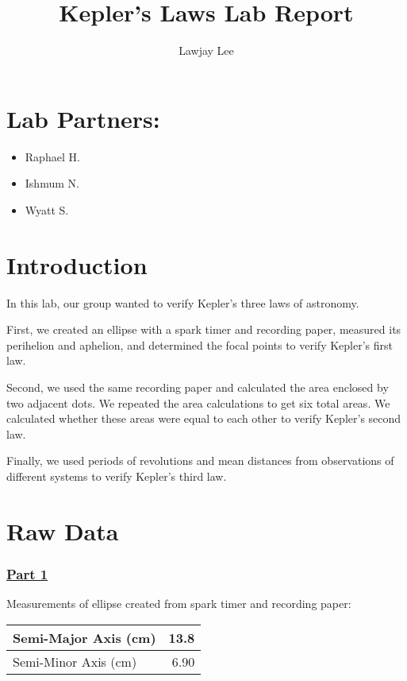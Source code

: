 \documentclass[fleqn]{article}
\title{Kepler's Laws Lab Report}
\author{Lawjay Lee}
\date{}
\begin{document}
\maketitle

\section*{Lab Partners:}
\begin{itemize}
	\item Raphael H.
	\item Ishmum N.
	\item Wyatt S.
\end{itemize}

\section*{Introduction}
In this lab, our group wanted to verify Kepler's three laws of astronomy.

First, we created an ellipse with a spark timer and recording paper, measured its perihelion and aphelion, and determined the focal points to verify Kepler's first law.

Second, we used the same recording paper and calculated the area enclosed by two adjacent dots. We repeated the area calculations to get six total areas. We calculated whether these areas were equal to each other to verify Kepler's second law.

Finally, we used periods of revolutions and mean distances from observations of different systems to verify Kepler's third law.
\pagebreak
\section*{Raw Data}
\subsubsection*{\underline{Part 1}}
Measurements of ellipse created from spark timer and recording paper:
\begin{table}[H]
	\setlength{\extrarowheight}{1pt}
	\begin{tabular}{|l|r|}
		\hline
		Semi-Major Axis (cm) & 13.8 \\ \hline
		Semi-Minor Axis (cm) & 6.90 \\ \hline
	\end{tabular}
\end{table}
\end{document}
